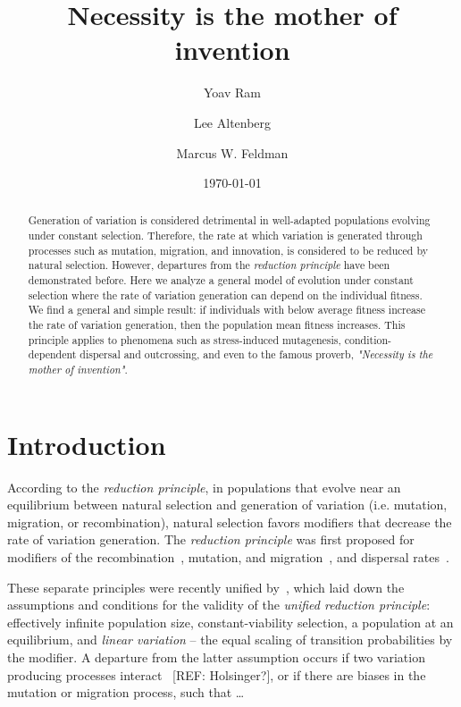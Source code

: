 \documentclass[a4paper,twocolumn]{article}   	%
\title{Necessity is the mother of invention}
\author[a]{Yoav Ram}
\author[b]{Lee Altenberg}
\author[a]{Marcus W. Feldman}
\affil[a]{Department of Biology, Stanford University, Stanford, CA}
\affil[b]{Information and Computer Sciences, University of Hawai`I at M{\=a}noa, Honolulu, HI}
\date{\today} %
\begin{document}
\maketitle

\begin{abstract}
Generation of variation is considered detrimental in well-adapted
populations evolving under constant selection. Therefore, the rate at
which variation is generated through processes such as mutation,
migration, and innovation, is considered to be reduced by natural
selection. However, departures from the \emph{reduction principle} have
been demonstrated before. Here we analyze a general model of evolution
under constant selection where the rate of variation generation can
depend on the individual fitness. We find a general and simple result:
if individuals with below average fitness increase the rate of variation
generation, then the population mean fitness increases. This principle
applies to phenomena such as stress-induced mutagenesis,
condition-dependent dispersal and outcrossing, and even to the famous
proverb, \emph{"Necessity is the mother of invention"}.
\end{abstract}

\section*{Introduction}

According to the \emph{reduction principle}, in populations that evolve near an equilibrium between natural selection and generation of variation (i.e. mutation, migration, or recombination), natural selection favors modifiers that decrease the rate of variation generation. 
The \emph{reduction principle} was first proposed for modifiers of the recombination~\citep{Feldman1972}, mutation, and migration~\citep{Liberman1986a}, and dispersal rates~\citep{Altenberg1987}.

These separate principles were recently unified by~\citet{Altenberg2017}, which laid down the assumptions and conditions for the validity of the \emph{unified reduction principle}: effectively infinite population size, constant-viability selection, a population at an equilibrium, and \emph{linear variation} -- the equal scaling of transition probabilities by the modifier.
A departure from the latter assumption occurs if two variation producing processes interact~\citep{Altenberg2012} [REF: Holsinger?], or if there are biases in the mutation or migration process, such that \ldots{}
\end{document}
